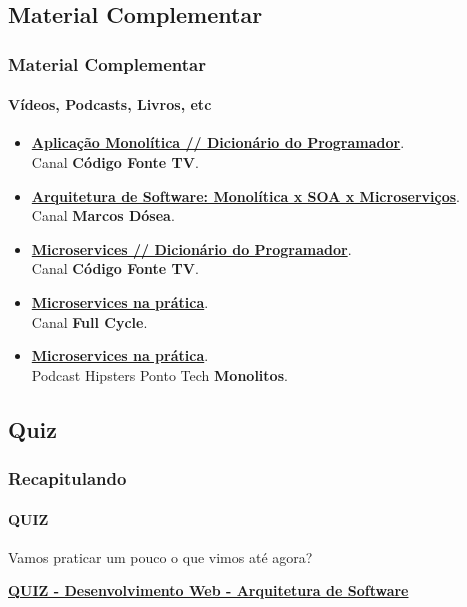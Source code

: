 \documentclass[
	10pt, %
	t, %
]{beamer}
\begin{document}


\subsection{Material Complementar}

\begin{frame}
	\frametitle{Material Complementar}
	\framesubtitle{Vídeos, Podcasts, Livros, etc}
	
	\begin{itemize}
		\item \href{https://youtu.be/CsrHHHPHKwE}{\textbf{Aplicação Monolítica // Dicionário do Programador}}.\\Canal \textbf{Código Fonte TV}.
		\item \href{https://youtu.be/suZfVAk7hco}{\textbf{Arquitetura de Software: Monolítica x SOA x Microserviços}}.\\Canal \textbf{Marcos Dósea}.
		\item \href{https://www.youtube.com/watch?v=_2bDOCTnbKc}{\textbf{Microservices // Dicionário do Programador}}.\\Canal \textbf{Código Fonte TV}.
		\item \href{https://youtu.be/gtv9szE_P1U}{\textbf{Microservices na prática}}.\\Canal \textbf{Full Cycle}.
		\item \href{https://www.hipsters.tech/uma-linguagem-para-cada-combate-hipsters-ponto-tech-277}{\textbf{Microservices na prática}}.\\Podcast Hipsters Ponto Tech \textbf{Monolitos}.
	\end{itemize}
	
\end{frame}

\subsection{Quiz}

\begin{frame}
	\frametitle{Recapitulando}
	\framesubtitle{QUIZ}

	Vamos praticar um pouco o que vimos até agora?
	\vfill

	\bigskip
	\centering

	\href{https://quizizz.com/admin/quiz/65832b860b273f1989868234?source=quiz_share}{\textbf{QUIZ - Desenvolvimento Web - Arquitetura de Software}}
	\vfill
		
\end{frame}
\end{document}
